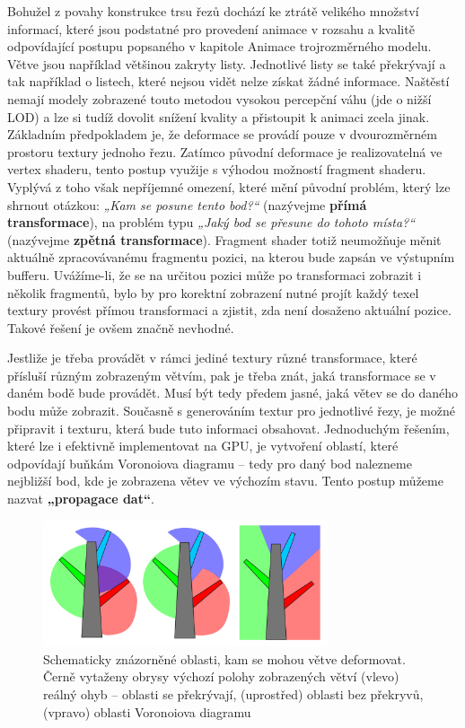 Bohužel z povahy konstrukce trsu řezů dochází ke ztrátě velikého množství informací, které jsou podstatné pro provedení animace v rozsahu a kvalitě odpovídající postupu popsaného v kapitole Animace trojrozměrného modelu. Větve jsou například většinou zakryty listy. Jednotlivé listy se také překrývají a tak například o listech, které nejsou vidět nelze získat žádné informace. Naštěstí nemají modely zobrazené touto metodou vysokou percepční váhu (jde o nižší LOD) a lze si tudíž dovolit snížení kvality a přistoupit k animaci zcela jinak.
Základním předpokladem je, že deformace se provádí pouze v dvourozměrném prostoru textury jednoho řezu. Zatímco původní deformace je realizovatelná ve vertex shaderu, tento postup využije s výhodou možností fragment shaderu. Vyplývá z toho však nepříjemné omezení, které mění původní problém, který lze shrnout otázkou: \emph{„Kam se posune tento bod?“} (nazývejme {\bf přímá transformace}), na problém typu \emph{„Jaký bod se přesune do tohoto místa?“} (nazývejme {\bf zpětná transformace}). Fragment shader totiž neumožňuje měnit aktuálně zpracovávanému fragmentu pozici, na kterou bude zapsán ve výstupním bufferu. Uvážíme-li, že se na určitou pozici může po transformaci zobrazit i několik fragmentů, bylo by pro korektní zobrazení nutné projít každý texel textury provést přímou transformaci a zjistit, zda není dosaženo aktuální pozice. Takové řešení je ovšem značně nevhodné.

Jestliže je třeba provádět v rámci jediné textury různé transformace, které přísluší různým zobrazeným větvím, pak je třeba znát, jaká transformace se v daném bodě bude provádět. Musí být tedy předem jasné, jaká větev se do daného bodu může zobrazit. Současně s generováním textur pro jednotlivé řezy, je možné připravit i texturu, která bude tuto informaci obsahovat. Jednoduchým řešením, které lze i efektivně implementovat na GPU, je vytvoření oblastí, které odpovídají buňkám Voronoiova diagramu – tedy pro daný bod nalezneme nejbližší bod, kde je zobrazena větev ve výchozím stavu. Tento postup můžeme nazvat {\bf „propagace dat“}.

\begin{figure}[!hbt]
\label{fig:sliceBilboard}
\begin{center}
\includegraphics[width=0.75\textwidth]{./figures/dataExpansionPrinciple.png}
\caption[Schematicky znázorněné oblasti, kam se mohou větve deformovat]%
{Schematicky znázorněné oblasti, kam se mohou větve deformovat. Černě vytaženy obrysy výchozí polohy zobrazených větví
(vlevo) reálný ohyb – oblasti se překrývají, (uprostřed) oblasti bez překryvů, (vpravo) oblasti Voronoiova diagramu}
\end{center}
\end{figure}

